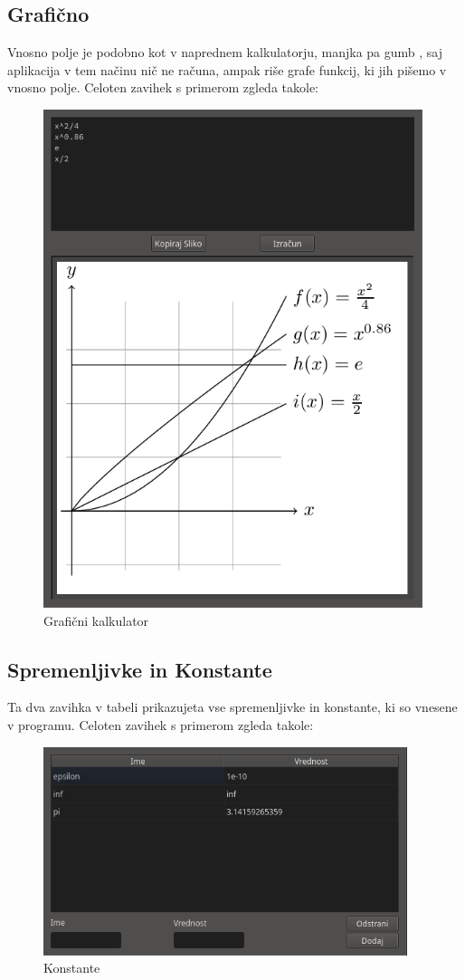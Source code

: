 \documentclass[12pt]{report}
\begin{document}
		\parbox{\textwidth}{
		\subsection{Grafično}
			Vnosno polje je podobno kot v naprednem kalkulatorju, manjka pa gumb , saj aplikacija v tem načinu nič ne računa, ampak riše grafe funkcij, ki jih pišemo v vnosno polje.
			Celoten zavihek s primerom zgleda takole:
			\begin{figure}[H]
				\centering
				\includegraphics[height=550px]{mw_plot.png}
				\caption{Grafični kalkulator}
				\label{fig:mw_plot}
			\end{figure}}
		\parbox{\textwidth}{
		\subsection{Spremenljivke in Konstante}
			Ta dva zavihka v tabeli prikazujeta vse spremenljivke in konstante, ki so vnesene v programu.
			Celoten zavihek s primerom zgleda takole:
			\begin{figure}[H]
				\centering
				\includegraphics[height=230px]{mw_const.png}
				\caption{Konstante}
				\label{fig:mw_const}
			\end{figure}}
\end{document}
